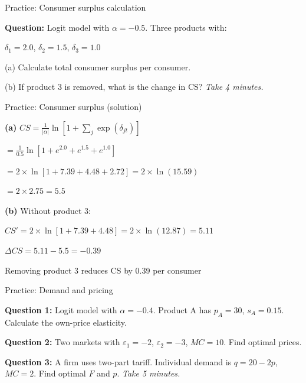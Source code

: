 \documentclass[notes,11pt, aspectratio=169]{beamer}
\newenvironment{wideitemize}{\itemize\addtolength{\itemsep}{10pt}}{\enditemize}
\begin{document}
\begin{frame}{Practice: Consumer surplus calculation}
	\begin{wideitemize}
		\item \textbf{Question:} Logit model with $\alpha = -0.5$. Three products with:
		\begin{wideitemize}
			\vspace{5pt}
			\item $\delta_1 = 2.0$, $\delta_2 = 1.5$, $\delta_3 = 1.0$
		\end{wideitemize}
		\item (a) Calculate total consumer surplus per consumer.
		\item (b) If product 3 is removed, what is the change in CS?
	\end{wideitemize}
	\vspace{10pt}
	\centering
	\textit{Take 4 minutes.}
\end{frame}

\begin{frame}{Practice: Consumer surplus (solution)}
	\begin{wideitemize}
		\item \textbf{(a)} $CS = \frac{1}{|\alpha|} \ln\left[1 + \sum_j \exp(\delta_{jt})\right]$
		\begin{wideitemize}
			\vspace{3pt}
			\item $= \frac{1}{0.5} \ln[1 + e^{2.0} + e^{1.5} + e^{1.0}]$
			\item $= 2 \times \ln[1 + 7.39 + 4.48 + 2.72] = 2 \times \ln(15.59)$
			\item $= 2 \times 2.75 = 5.5$
		\end{wideitemize}
		\item \textbf{(b)} Without product 3:
		\begin{wideitemize}
			\vspace{3pt}
			\item $CS' = 2 \times \ln[1 + 7.39 + 4.48] = 2 \times \ln(12.87) = 5.11$
			\item $\Delta CS = 5.11 - 5.5 = -0.39$
		\end{wideitemize}
		\item Removing product 3 reduces CS by 0.39 per consumer
	\end{wideitemize}
\end{frame}

\begin{frame}{Practice: Demand and pricing}
	\begin{wideitemize}
		\item \textbf{Question 1:} Logit model with $\alpha = -0.4$. Product A has $p_A = 30$, $s_A = 0.15$. Calculate the own-price elasticity.
		\item \textbf{Question 2:} Two markets with $\varepsilon_1 = -2$, $\varepsilon_2 = -3$, $MC = 10$. Find optimal prices.
		\item \textbf{Question 3:} A firm uses two-part tariff. Individual demand is $q = 20 - 2p$, $MC = 2$. Find optimal $F$ and $p$.
	\end{wideitemize}
	\vspace{10pt}
	\centering
	\textit{Take 5 minutes.}
\end{frame}
\end{document}
